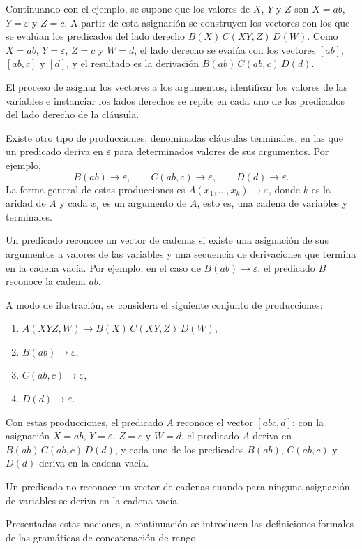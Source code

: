 Continuando con el ejemplo, se supone que los valores de $X$, $Y$ y
$Z$ son $X = ab$, $Y = \varepsilon$ y $Z = c$. A partir de esta
asignación se construyen los vectores con los que se evalúan los
predicados del lado derecho $B(X)\, C(XY, Z)\, D(W)$. Como $X = ab$,
$Y = \varepsilon$, $Z = c$ y $W = d$, el lado derecho se evalúa con los
vectores $[ab]$, $[ab, c]$ y $[d]$, y el resultado es la derivación
$B(ab)\, C(ab, c)\, D(d)$.

El proceso de asignar los vectores a los argumentos, identificar los
valores de las variables e instanciar los lados derechos se repite en
cada uno de los predicados del lado derecho de la cláusula.

Existe otro tipo de producciones, denominadas cláusulas terminales, en
las que un predicado deriva en $\varepsilon$ para determinados valores
de sus argumentos. Por ejemplo,
\[
  B(ab) \to \varepsilon, \qquad
  C(ab, c) \to \varepsilon, \qquad
  D(d) \to \varepsilon.
\]
La forma general de estas producciones es
$A(x_1, \dots, x_k) \to \varepsilon$, donde $k$ es la aridad de $A$ y
cada $x_i$ es un argumento de $A$, esto es, una cadena de variables y
terminales.

Un predicado reconoce un vector de cadenas si existe una asignación de
sus argumentos a valores de las variables y una secuencia de
derivaciones que termina en la cadena vacía. Por ejemplo, en el caso de
$B(ab) \to \varepsilon$, el predicado $B$ reconoce la cadena $ab$.

A modo de ilustración, se considera el siguiente conjunto de
producciones:
\begin{enumerate}
  \item $A(XYZ, W) \to B(X)\, C(XY, Z)\, D(W)$,
  \item $B(ab) \to \varepsilon$,
  \item $C(ab, c) \to \varepsilon$,
  \item $D(d) \to \varepsilon$.
\end{enumerate}
Con estas producciones, el predicado $A$ reconoce el vector $[abc, d]$:
con la asignación $X = ab$, $Y = \varepsilon$, $Z = c$ y $W = d$, el
predicado $A$ deriva en $B(ab)\, C(ab, c)\, D(d)$, y cada uno de los
predicados $B(ab)$, $C(ab, c)$ y $D(d)$ deriva en la cadena vacía.

Un predicado no reconoce un vector de cadenas cuando para ninguna
asignación de variables se deriva en la cadena vacía.

Presentadas estas nociones, a continuación se introducen las
definiciones formales de las gramáticas de concatenación de rango.

